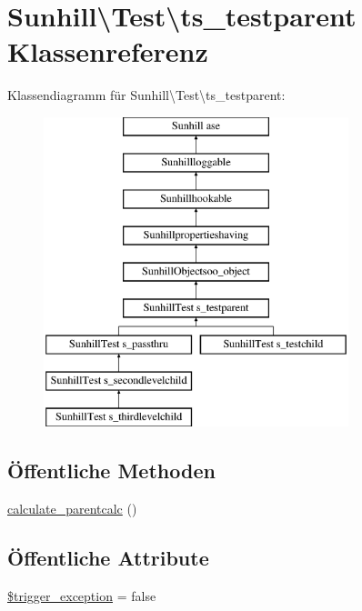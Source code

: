 \hypertarget{classSunhill_1_1Test_1_1ts__testparent}{}\section{Sunhill\textbackslash{}Test\textbackslash{}ts\+\_\+testparent Klassenreferenz}
\label{classSunhill_1_1Test_1_1ts__testparent}
Klassendiagramm für Sunhill\textbackslash{}Test\textbackslash{}ts\+\_\+testparent\+:\begin{figure}[H]
\begin{center}
\leavevmode
\includegraphics[height=9.000000cm]{d5/dff/classSunhill_1_1Test_1_1ts__testparent}
\end{center}
\end{figure}
\subsection*{Öffentliche Methoden}
\begin{DoxyCompactItemize}
\item 
\hyperlink{classSunhill_1_1Test_1_1ts__testparent_ae36451408fb8bb3cba6fed8bb167d4fa}{calculate\+\_\+parentcalc} ()
\end{DoxyCompactItemize}
\subsection*{Öffentliche Attribute}
\begin{DoxyCompactItemize}
\item 
\hyperlink{classSunhill_1_1Test_1_1ts__testparent_ade9e80c45ae395ed4ad89f4df7a1c042}{\$trigger\+\_\+exception} = false
\end{DoxyCompactItemize}

